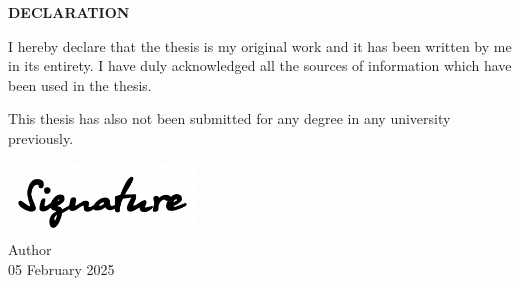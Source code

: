 \begin{center}
    {\large \textbf{DECLARATION}}
\end{center}

\vspace{3cm}

\begin{center}
    I hereby declare that the thesis is my original work and it has
    been written by me in its entirety. I have duly
    acknowledged all the sources of information which have
    been used in the thesis.

    \vspace{1cm}

    This thesis has also not been submitted for any degree in any
    university previously.

    \vspace{4cm}

    \includegraphics[width=5cm]{misc./signature.png}\\[0.5cm]
    Author\\
    05 February 2025
\end{center}

\thispagestyle{plain}
\clearpage
